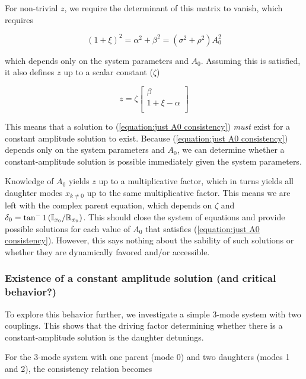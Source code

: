 For non-trivial $z$, we require the determinant of this matrix to vanish, which requires

\begin{equation}\label{equation:just A0 consistency}
(1+\xi)^2 = \alpha^2 + \beta^2 = \left(\sigma^2 + \rho^2\right) A_0^2
\end{equation}

which depends only on the system parameters and $A_0$. Assuming this is satisfied, it also defines $z$ up to a scalar constant ($\zeta$)

\begin{equation}
z = \zeta \begin{bmatrix}\beta \\ 1 + \xi - \alpha \\ \end{bmatrix}
\end{equation}

This means that a solution to (\ref{equation:just A0 consistency}) \emph{must} exist for a constant amplitude solution to exist. Because (\ref{equation:just A0 consistency}) depends only on the system parameters and $A_0$, we can determine whether a constant-amplitude solution is possible immediately given the system parameters.

Knowledge of $A_0$ yields $z$ up to a multiplicative factor, which in turns yields all daughter modes $x_{k\neq0}$ up to the same multiplicative factor. This means we are left with the complex parent equation, which depends on $\zeta$ and $\delta_0=\tan^-1 \left(\mathbb{I}_{x_0}/\mathbb{R}_{x_0}\right)$. This should close the system of equations and provide possible solutions for each value of $A_0$ that satisfies (\ref{equation:just A0 consistency}). However, this says nothing about the sability of such solutions or whether they are dynamically favored and/or accessible.

\subsubsection{Existence of a constant amplitude solution (and critical behavior?)}

To explore this behavior further, we investigate a simple 3-mode system with two couplings. This shows that the driving factor determining whether there is a constant-amplitude solution is the daughter detunings.

For the 3-mode system with one parent (mode 0) and two daughters (modes 1 and 2), the consistency relation becomes

